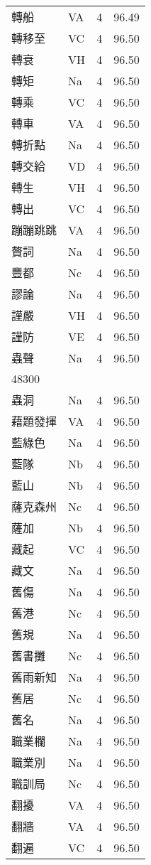 \documentclass[twocolumn]{book}
\begin{document}
\begin{supertabular}{llrr}
轉船 & VA & 4 &  96.49\\
轉移至 & VC & 4 &  96.50\\
轉衰 & VH & 4 &  96.50\\
轉矩 & Na & 4 &  96.50\\
轉乘 & VC & 4 &  96.50\\
轉車 & VA & 4 &  96.50\\
轉折點 & Na & 4 &  96.50\\
轉交給 & VD & 4 &  96.50\\
轉生 & VH & 4 &  96.50\\
轉出 & VC & 4 &  96.50\\
蹦蹦跳跳 & VA & 4 &  96.50\\
贅詞 & Na & 4 &  96.50\\
豐都 & Nc & 4 &  96.50\\
謬論 & Na & 4 &  96.50\\
謹嚴 & VH & 4 &  96.50\\
謹防 & VE & 4 &  96.50\\
蟲聲 & Na & 4 &  96.50\\
48300\\
蟲洞 & Na & 4 &  96.50\\
藉題發揮 & VA & 4 &  96.50\\
藍綠色 & Na & 4 &  96.50\\
藍隊 & Nb & 4 &  96.50\\
藍山 & Nb & 4 &  96.50\\
薩克森州 & Nc & 4 &  96.50\\
薩加 & Nb & 4 &  96.50\\
藏起 & VC & 4 &  96.50\\
藏文 & Na & 4 &  96.50\\
舊傷 & Na & 4 &  96.50\\
舊港 & Nc & 4 &  96.50\\
舊規 & Na & 4 &  96.50\\
舊書攤 & Nc & 4 &  96.50\\
舊雨新知 & Na & 4 &  96.50\\
舊居 & Nc & 4 &  96.50\\
舊名 & Na & 4 &  96.50\\
職業欄 & Na & 4 &  96.50\\
職業別 & Na & 4 &  96.50\\
職訓局 & Nc & 4 &  96.50\\
翻擾 & VA & 4 &  96.50\\
翻牆 & VA & 4 &  96.50\\
翻遍 & VC & 4 &  96.50\\

\end{supertabular}
\end{document}
